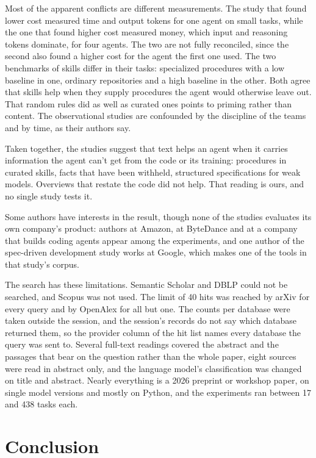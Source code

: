 Most of the apparent conflicts are different measurements.
The study that found lower cost measured time and output tokens for one agent
on small tasks, while the one that found higher cost measured money, which
input and reasoning tokens dominate, for four agents.
The two are not fully reconciled, since the second also found a higher cost for
the agent the first one used.
The two benchmarks of skills differ in their tasks: specialized procedures with
a low baseline in one, ordinary repositories and a high baseline in the other.
Both agree that skills help when they supply procedures the agent would
otherwise leave out.
That random rules did as well as curated ones points to priming rather than
content.
The observational studies are confounded by the discipline of the teams and by
time, as their authors say.

Taken together, the studies suggest that text helps an agent when it carries
information the agent can't get from the code or its training: procedures in
curated skills, facts that have been withheld, structured specifications for
weak models.
Overviews that restate the code did not help.
That reading is ours, and no single study tests it.

Some authors have interests in the result, though none of the studies evaluates
its own company's product: authors at Amazon, at ByteDance and at a company
that builds coding agents appear among the experiments, and one author of the
spec-driven development study works at Google, which makes one of the tools in
that study's corpus.

The search has these limitations.
Semantic Scholar and DBLP could not be searched, and Scopus was not used.
The limit of 40 hits was reached by arXiv for every query and by OpenAlex for
all but one.
The counts per database were taken outside the session, and the session's
records do not say which database returned them, so the provider column of the
hit list names every database the query was sent to.
Several full-text readings covered the abstract and the passages that bear on
the question rather than the whole paper, eight sources were read in abstract
only, and the language model's classification was changed on title and
abstract.
Nearly everything is a 2026 preprint or workshop paper, on single model
versions and mostly on Python, and the experiments ran between 17 and 438 tasks
each.

\section{Conclusion}
\label{sec:ai-rq4-conclusion}

